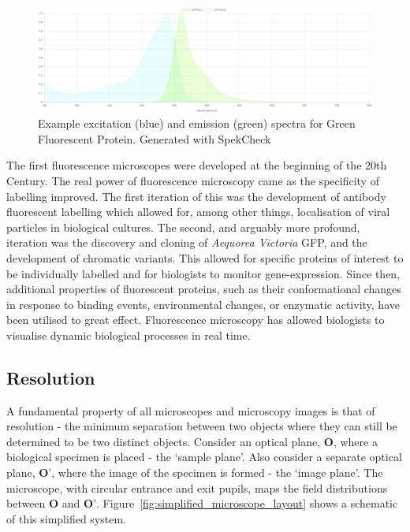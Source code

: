 \begin{figure}
	\centering
	\includegraphics[width=\textwidth]{images/GFP_emission_absorption_spectra.jpg}
	\caption[Example excitation and emission spectra]{Example excitation (blue) 
		and emission (green) spectra for Green Fluorescent Protein. Generated with SpekCheck\cite{phillips2018spekcheck}}
	\label{fig:GFP_emission_absorption_spectra}
\end{figure}

The first fluorescence microscopes were developed at the beginning of the 20th Century\cite{yuste2005fluorescence,renz2013fluorescence}. The real power of 
fluorescence microscopy came as the specificity of labelling improved. The 
first iteration of this was the development of antibody fluorescent labelling 
which allowed for, among other things, localisation of viral particles in 
biological 
cultures\cite{coons1942demonstration,coons1951fluorescent,weller1954fluorescent}.
The second, and arguably more profound, iteration was the discovery and 
cloning of \textit{Aequorea Victoria} GFP, and the development of chromatic
variants\cite{prasher1992primary,heim1996engineering}. This allowed for 
specific proteins of interest to be individually labelled and for biologists 
to monitor gene-expression\cite{chalfie1994green}. Since then, additional 
properties of fluorescent proteins, such as their conformational changes 
in response to binding events, environmental changes, or enzymatic activity, 
have been utilised to great effect\cite{toseland2013fluorescent}. 
Fluorescence microscopy has allowed biologists to visualise dynamic biological
processes in real time.

\subsection{Resolution}
\label{subsec:resolution}

A fundamental property of all microscopes and microscopy images is that of 
resolution - the minimum separation between two objects where they can still
be determined to be two distinct objects. Consider an optical plane, 
$\textbf{O}$, where a biological specimen is placed - the `sample plane'. Also
consider a separate optical plane, $\textbf{O'}$, where the image of the
specimen is formed - the `image plane'. The microscope, with circular entrance
and exit pupils, maps the field distributions between $\textbf{O}$ and 
$\textbf{O'}$. Figure~\ref{fig:simplified_microscope_layout} shows a schematic
of this simplified system.

